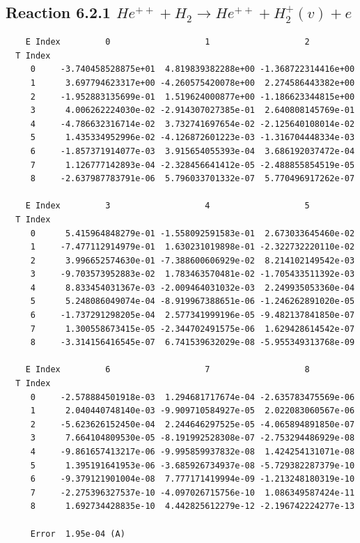 \documentclass[12pt,dvipdfmx]{article}
\begin{document}
\newpage
\subsection{
Reaction 6.2.1 $   He^{++} + H_2 \rightarrow He^{++} + H_2^+(v) + e$}


\begin{small}\begin{verbatim}
    E Index         0                   1                   2
  T Index
     0     -3.740458528875e+01  4.819839382288e+00 -1.368722314416e+00
     1      3.697794623317e+00 -4.260575420078e+00  2.274586443382e+00
     2     -1.952883135699e-01  1.519624000877e+00 -1.186623344815e+00
     3      4.006262224030e-02 -2.914307027385e-01  2.640808145769e-01
     4     -4.786632316714e-02  3.732741697654e-02 -2.125640108014e-02
     5      1.435334952996e-02 -4.126872601223e-03 -1.316704448334e-03
     6     -1.857371914077e-03  3.915654055393e-04  3.686192037472e-04
     7      1.126777142893e-04 -2.328456641412e-05 -2.488855854519e-05
     8     -2.637987783791e-06  5.796033701332e-07  5.770496917262e-07

    E Index         3                   4                   5
  T Index
     0      5.415964848279e-01 -1.558092591583e-01  2.673033645460e-02
     1     -7.477112914979e-01  1.630231019898e-01 -2.322732220110e-02
     2      3.996652574630e-01 -7.388600606929e-02  8.214102149542e-03
     3     -9.703573952883e-02  1.783463570481e-02 -1.705433511392e-03
     4      8.833454031367e-03 -2.009464031032e-03  2.249935053360e-04
     5      5.248086049074e-04 -8.919967388651e-06 -1.246262891020e-05
     6     -1.737291298205e-04  2.577341999196e-05 -9.482137841850e-07
     7      1.300558673415e-05 -2.344702491575e-06  1.629428614542e-07
     8     -3.314156416545e-07  6.741539632029e-08 -5.955349313768e-09

    E Index         6                   7                   8
  T Index
     0     -2.578884501918e-03  1.294681717674e-04 -2.635783475569e-06
     1      2.040440748140e-03 -9.909710584927e-05  2.022083060567e-06
     2     -5.623626152450e-04  2.244646297525e-05 -4.065894891850e-07
     3      7.664104809530e-05 -8.191992528308e-07 -2.753294486929e-08
     4     -9.861657413217e-06 -9.995859937832e-08  1.424254131071e-08
     5      1.395191641953e-06 -3.685926734937e-08 -5.729382287379e-10
     6     -9.379121901004e-08  7.777171419994e-09 -1.213248180319e-10
     7     -2.275396327537e-10 -4.097026715756e-10  1.086349587424e-11
     8      1.692734428835e-10  4.442825612279e-12 -2.196742224277e-13

     Error  1.95e-04 (A)
\end{verbatim}\end{small}
\end{document}
